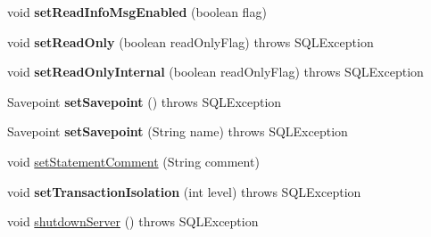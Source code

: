 \begin{DoxyCompactItemize}
\item 
\mbox{\label{classcom_1_1mysql_1_1jdbc_1_1_multi_host_my_s_q_l_connection_a0a37c24aeba34398217bda1ead6980f4}} 
void {\bfseries set\+Read\+Info\+Msg\+Enabled} (boolean flag)
\item 
\mbox{\label{classcom_1_1mysql_1_1jdbc_1_1_multi_host_my_s_q_l_connection_a2f9bef3d6f2da148fd3551cf64852aa6}} 
void {\bfseries set\+Read\+Only} (boolean read\+Only\+Flag)  throws S\+Q\+L\+Exception 
\item 
\mbox{\label{classcom_1_1mysql_1_1jdbc_1_1_multi_host_my_s_q_l_connection_ac6a036b191b6b23bfb2c9c9ea3db768c}} 
void {\bfseries set\+Read\+Only\+Internal} (boolean read\+Only\+Flag)  throws S\+Q\+L\+Exception 
\item 
\mbox{\label{classcom_1_1mysql_1_1jdbc_1_1_multi_host_my_s_q_l_connection_aa4f778ea418635c49c5058b5aa123062}} 
Savepoint {\bfseries set\+Savepoint} ()  throws S\+Q\+L\+Exception 
\item 
\mbox{\label{classcom_1_1mysql_1_1jdbc_1_1_multi_host_my_s_q_l_connection_a208150424af7f53f3890b19fc7239400}} 
Savepoint {\bfseries set\+Savepoint} (String name)  throws S\+Q\+L\+Exception 
\item 
void \mbox{\hyperlink{classcom_1_1mysql_1_1jdbc_1_1_multi_host_my_s_q_l_connection_ae16daacee48aa9a98fa24374bf6e7681}{set\+Statement\+Comment}} (String comment)
\item 
\mbox{\label{classcom_1_1mysql_1_1jdbc_1_1_multi_host_my_s_q_l_connection_ae0615cf6ccc1d326906766c35e91d1f1}} 
void {\bfseries set\+Transaction\+Isolation} (int level)  throws S\+Q\+L\+Exception 
\item 
void \mbox{\hyperlink{classcom_1_1mysql_1_1jdbc_1_1_multi_host_my_s_q_l_connection_a84e14d759493436465fa6bf6160e5153}{shutdown\+Server}} ()  throws S\+Q\+L\+Exception 
\item 
\mbox{\label{classcom_1_1mysql_1_1jdbc_1_1_multi_host_my_s_q_l_connection_aeb36ad37ea80b352816b4aed3b6a21e5}} 

\end{DoxyCompactItemize}
